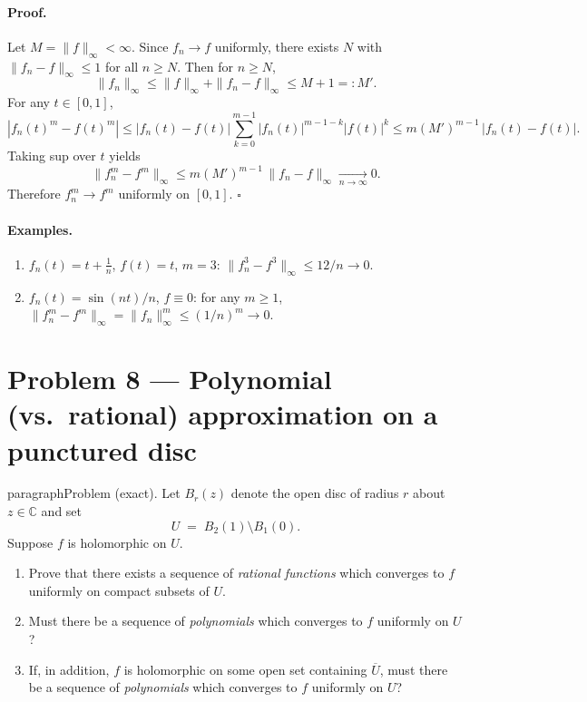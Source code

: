 \documentclass[12pt,a4paper]{article}
\newcommand{\qed}{\hfill$\square$}
\theoremstyle{plain}
\theoremstyle{definition}
\theoremstyle{remark}
\theoremstyle{remark}
\begin{document}
\paragraph{Proof.}
Let $M=\|f\|_\infty<\infty$. Since $f_n\to f$ uniformly, there exists $N$ with
$\|f_n-f\|_\infty\le 1$ for all $n\ge N$. Then for $n\ge N$,
\[
\|f_n\|_\infty \le \|f\|_\infty+\|f_n-f\|_\infty \le M+1=:M'.
\]
For any $t\in[0,1]$,
\[
|f_n(t)^m-f(t)^m|
\le |f_n(t)-f(t)| \sum_{k=0}^{m-1} |f_n(t)|^{m-1-k} |f(t)|^{k}
\le m(M')^{m-1}\,|f_n(t)-f(t)|.
\]
Taking sup over $t$ yields
\[
\|f_n^m-f^m\|_\infty \le m(M')^{m-1}\,\|f_n-f\|_\infty \xrightarrow[n\to\infty]{} 0.
\]
Therefore $f_n^m\to f^m$ uniformly on $[0,1]$.
\qed

\paragraph{Examples.}
\begin{enumerate}[label=(\arabic*), leftmargin=*]
	\item $f_n(t)=t+\tfrac1n$, $f(t)=t$, $m=3$: 
	$\|f_n^3-f^3\|_\infty \le 12/n \to 0$.
	\item $f_n(t)=\sin(nt)/n$, $f\equiv0$: for any $m\ge1$,
	$\|f_n^m-f^m\|_\infty=\|f_n\|_\infty^m \le (1/n)^m \to 0$.
\end{enumerate}

\section*{Problem 8 — Polynomial (vs.\ rational) approximation on a punctured disc}


paragraph{Problem (exact).}
Let $B_r(z)$ denote the open disc of radius $r$ about $z\in\mathbb C$ and set
\[
U \;=\; B_2(1)\setminus B_1(0).
\]
Suppose $f$ is holomorphic on $U$.
\begin{enumerate}[label=(\roman*), leftmargin=*]
	\item Prove that there exists a sequence of \emph{rational functions} which converges to $f$
	uniformly on compact subsets of $U$.
	\item Must there be a sequence of \emph{polynomials} which converges to $f$ uniformly on $U$?
	\item If, in addition, $f$ is holomorphic on some open set containing $\overline U$,
	must there be a sequence of \emph{polynomials} which converges to $f$ uniformly on $U$?
\end{enumerate}
\end{document}
